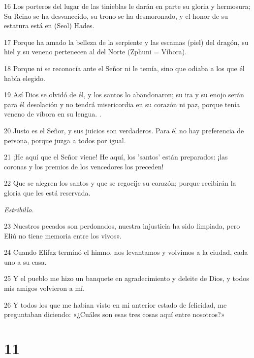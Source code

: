 \par 16 Los porteros del lugar de las tinieblas le darán en parte su gloria y hermosura; Su Reino se ha desvanecido, su trono se ha desmoronado, y el honor de su estatura está en (Seol) Hades.

\par 17 Porque ha amado la belleza de la serpiente y las escamas (piel) del dragón, su hiel y su veneno pertenecen al del Norte (Zphuni = Víbora).

\par 18 Porque ni se reconocía ante el Señor ni le temía, sino que odiaba a los que él había elegido.

\par 19 Así Dios se olvidó de él, y los santos lo abandonaron; su ira y su enojo serán para él desolación y no tendrá misericordia en su corazón ni paz, porque tenía veneno de víbora en su lengua. .

\par 20 Justo es el Señor, y sus juicios son verdaderos. Para él no hay preferencia de persona, porque juzga a todos por igual.

\par 21 ¡He aquí que el Señor viene! He aquí, los 'santos' están preparados: ¡las coronas y los premios de los vencedores los preceden!

\par 22 Que se alegren los santos y que se regocije su corazón; porque recibirán la gloria que les está reservada.

\par \textit{Estribillo.}

\par 23 Nuestros pecados son perdonados, nuestra injusticia ha sido limpiada, pero Eliú no tiene memoria entre los vivos».

\par 24 Cuando Elifaz terminó el himno, nos levantamos y volvimos a la ciudad, cada uno a su casa.

\par 25 Y el pueblo me hizo un banquete en agradecimiento y deleite de Dios, y todos mis amigos volvieron a mí.

\par 26 Y todos los que me habían visto en mi anterior estado de felicidad, me preguntaban diciendo: «¿Cuáles son esas tres cosas aquí entre nosotros?»

\chapter{11}

